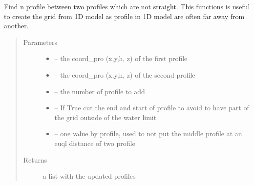 \documentclass[letterpaper,10pt,english]{sphinxmanual}
\begin{document}

\begin{fulllineitems}
\label{\detokenize{index:src.manage_grid_8.find_profile_between}}
Find n profile between two profiles which are not straight. This functions is useful to create the grid from 1D model
as profile in 1D model are often far away from another.
\begin{quote}\begin{description}
\item[{Parameters}] \leavevmode\begin{itemize}
\item {} 
 -- the coord\_pro (x,y,h, z) of the first profile

\item {} 
 -- the coord\_pro (x,y,h, z) of the second profile

\item {} 
 -- the number of profile to add

\item {} 
 -- If True cut the end and start of profile to avoid to have part of the grid outside of the water limit

\item {} 
 -- one value by profile, used to not put the middle profile at an euql distance of two profile

\end{itemize}

\item[{Returns}] \leavevmode
a list with the updated profiles

\end{description}\end{quote}

\end{fulllineitems}

\end{document}
